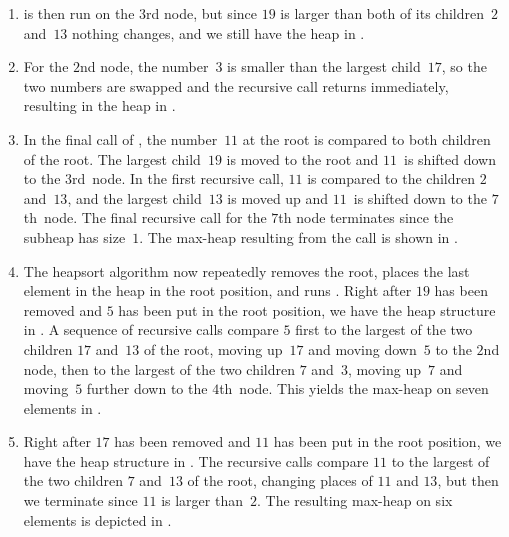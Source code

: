 \documentclass{jn-pset}
\begin{document}
\begin{problem}
\begin{solution}
\begin{enumerate}
  \item 
    \maxheapify is then run on the $3$rd node,
    but since $19$ is larger than both of its children~$2$
    and~$13$ nothing changes, and we still have the heap in
    .
    
  \item 
    For the $2$nd node, the number~$3$ is smaller than the largest
    child~$17$, so the two numbers are swapped and the recursive
    \maxheapify call returns immediately, resulting in the heap in
    .

  \item 
    In the final \maxheapify call of \buildmaxheap, the number~$11$ at the
    root is compared to both children of the root. The largest
    child~$19$  is moved to the root and $11$~is shifted down to the
    $3$rd~node. 
    In the first recursive \maxheapify call, $11$ is compared to the
    children $2$ and~$13$, and the largest child~$13$ is moved up and
    $11$~is shifted down to the $7$th~node.
    The final recursive call
    for the $7$th node terminates since the subheap has size~$1$.
    The max-heap resulting from the \buildmaxheap call is shown in
    .

  \item
    The heapsort algorithm now repeatedly removes the root, places
    the last element in the heap in the root position, and runs
    \maxheapify.
    Right after $19$ has been removed and $5$ has been put in the root
    position, we have the heap structure in    
    .
    A sequence of recursive \maxheapify calls compare
    $5$  first  to the largest of the two children $17$ and~$13$ of the
    root,
    moving up~$17$ and moving down~$5$ to the $2$nd node,
    then to the largest of the two children $7$ and~$3$,
    moving up~$7$ and moving~$5$ further down to the $4$th~node. 
    This yields the max-heap on seven elements in
    .

  \item
    Right after $17$ has been removed and $11$ has been put in the root
    position, we have the heap structure in    
    .
    The recursive \maxheapify calls compare
    $11$  to the largest of the two children $7$ and~$13$ of the root,
    changing places of $11$ and $13$,
    but then we terminate since $11$ is larger than~$2$.
    The resulting  max-heap on six elements is depicted in
    .


\end{enumerate}
\end{solution}
\end{problem}
\end{document}
